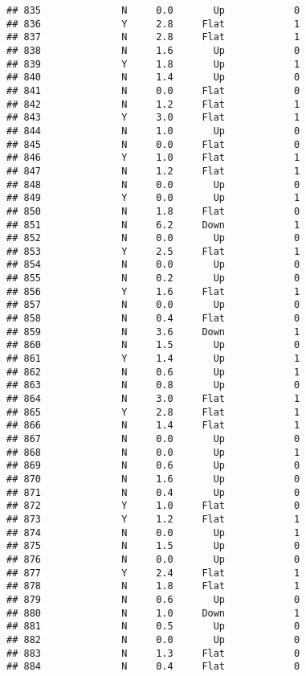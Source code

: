 \documentclass[
]{article}
\begin{document}
\begin{verbatim}
## 835              N     0.0       Up            0
## 836              Y     2.8     Flat            1
## 837              N     2.8     Flat            1
## 838              N     1.6       Up            0
## 839              Y     1.8       Up            1
## 840              N     1.4       Up            0
## 841              N     0.0     Flat            0
## 842              N     1.2     Flat            1
## 843              Y     3.0     Flat            1
## 844              N     1.0       Up            0
## 845              N     0.0     Flat            0
## 846              Y     1.0     Flat            1
## 847              N     1.2     Flat            1
## 848              N     0.0       Up            0
## 849              Y     0.0       Up            1
## 850              N     1.8     Flat            0
## 851              N     6.2     Down            1
## 852              N     0.0       Up            0
## 853              Y     2.5     Flat            1
## 854              N     0.0       Up            0
## 855              N     0.2       Up            0
## 856              Y     1.6     Flat            1
## 857              N     0.0       Up            0
## 858              N     0.4     Flat            0
## 859              N     3.6     Down            1
## 860              N     1.5       Up            0
## 861              Y     1.4       Up            1
## 862              N     0.6       Up            1
## 863              N     0.8       Up            0
## 864              N     3.0     Flat            1
## 865              Y     2.8     Flat            1
## 866              N     1.4     Flat            1
## 867              N     0.0       Up            0
## 868              N     0.0       Up            1
## 869              N     0.6       Up            0
## 870              N     1.6       Up            0
## 871              N     0.4       Up            0
## 872              Y     1.0     Flat            0
## 873              Y     1.2     Flat            1
## 874              N     0.0       Up            1
## 875              N     1.5       Up            0
## 876              N     0.0       Up            0
## 877              Y     2.4     Flat            1
## 878              N     1.8     Flat            1
## 879              N     0.6       Up            0
## 880              N     1.0     Down            1
## 881              N     0.5       Up            0
## 882              N     0.0       Up            0
## 883              N     1.3     Flat            0
## 884              N     0.4     Flat            0

\end{verbatim}
\end{document}
